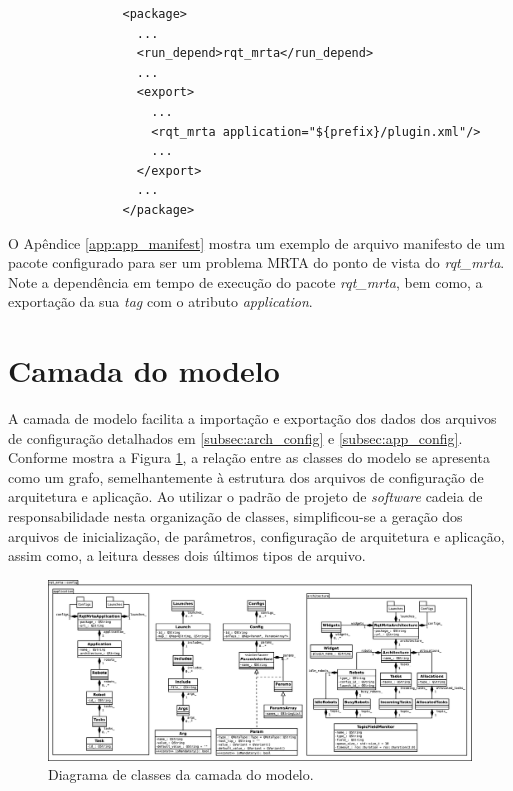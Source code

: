             \begin{lstlisting}
                <package>
                  ...
                  <run_depend>rqt_mrta</run_depend>
                  ...
                  <export>
                    ...
                    <rqt_mrta application="${prefix}/plugin.xml"/>
                    ...
                  </export>
                  ...
                </package>
            \end{lstlisting}
            
            O Apêndice \ref{app:app_manifest} mostra um exemplo de arquivo manifesto de um pacote configurado para ser um problema MRTA do ponto de vista do \textit{rqt\_mrta}. Note a dependência em tempo de execução do pacote \textit{rqt\_mrta}, bem como, a exportação da sua \textit{tag} com o atributo \textit{application}.
    
    \section{Camada do modelo} \label{subset:rqt_mrta_model}
        A camada de modelo facilita a importação e exportação dos dados dos arquivos de configuração detalhados em \ref{subsec:arch_config} e \ref{subsec:app_config}. Conforme mostra a Figura \ref{fig:rqt_mrta_model_uml}, a relação entre as classes do modelo se apresenta como um grafo, semelhantemente à estrutura dos arquivos de configuração de arquitetura e aplicação. Ao utilizar o padrão de projeto de \textit{software} cadeia de responsabilidade \cite{ref:gamma1993design} nesta organização de classes, simplificou-se a geração dos arquivos de inicialização, de parâmetros, configuração de arquitetura e aplicação, assim como, a leitura desses dois últimos tipos de arquivo.
        
        \begin{figure}[p]
            \centering
            \includegraphics[width=.97\textheight,angle=90]{Figuras/3_desenvolvimento/rqt_mrta_model_uml.eps}
            \caption{Diagrama de classes da camada do modelo.} \label{fig:rqt_mrta_model_uml}
        \end{figure}
        
